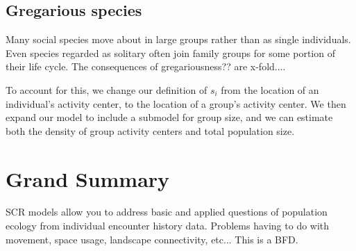 \subsection{Gregarious species}

Many social species move about in large groups rather than as single
individuals. Even species regarded as solitary often join family
groups for some portion of their life cycle. The consequences of
gregariousness?? are x-fold....

To account for this, we change our definition of $s_i$ from the
location of an individual's activity center, to the location of a
group's activity center. We then expand our model to include a
submodel for group size, and we can estimate both the density of group
activity centers and total population size.


\section{Grand Summary}


SCR models allow you to address basic and applied questions of
population ecology from individual encounter history data. Problems
having to do with movement, space usage, landscape connectivity,
etc... This is a BFD. 

